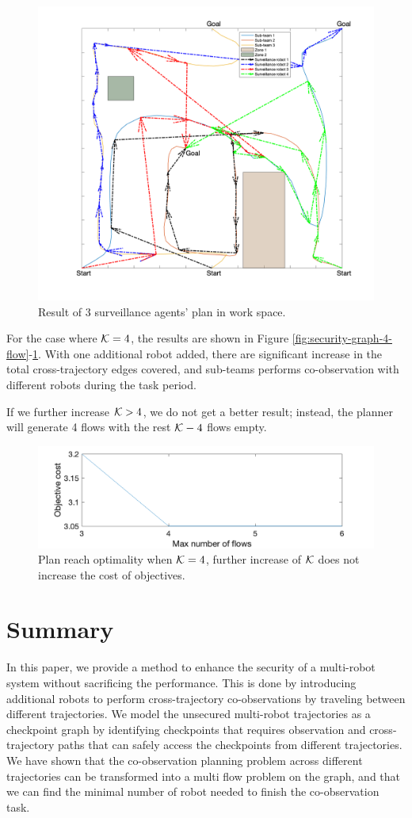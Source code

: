 \documentclass[journal]{IEEEtran}  %
\begin{document}
\begin{figure}[htbp]
\begin{center}
\includegraphics[width=0.6\linewidth]{4_flow_result}
\caption{Result of 3 surveillance agents' plan in work space.}
\label{fig:workspace-4-flow}
\end{center}
\end{figure}

For the case where $\mathcal{K}=4$, the results are shown in Figure \ref{fig:security-graph-4-flow}-\ref{fig:workspace-4-flow}. With one additional robot added, there are significant increase in the total cross-trajectory edges covered, and sub-teams performs co-observation with different robots during the task period.

If we further increase $\mathcal{K}>4$, we do not get a better result; instead, the planner will generate 4 flows with the rest $\mathcal{K}-4$ flows empty.

\begin{figure}[htbp]
\begin{center}
\includegraphics[width=0.6\linewidth]{nflow_vs_cost}
\caption{Plan reach optimality when $\mathcal{K}=4$, further increase of $\mathcal{K}$ does not increase the cost of objectives.}
\label{fig:flow-n-vs-cost}
\end{center}
\end{figure}

\section{Summary}
In this paper, we provide a method to enhance the security of a multi-robot system without sacrificing the performance. This is done by introducing additional robots to perform cross-trajectory co-observations by traveling between different trajectories. We model the unsecured multi-robot trajectories as a checkpoint graph by identifying checkpoints that requires observation and cross-trajectory paths that can safely access the checkpoints from different trajectories. We have shown that the co-observation planning problem across different trajectories can be transformed into a multi flow problem on the graph, and that we can find the minimal number of robot needed to finish the co-observation task.
\end{document}
